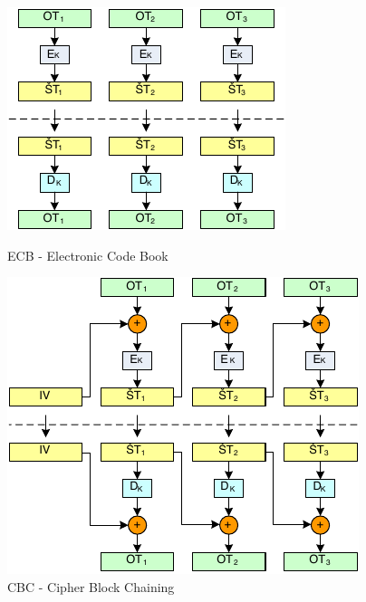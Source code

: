 \documentclass{szzclass}
\begin{document}
\begin{figure}[ht!]
\centering
\begin{minipage}{.5\textwidth}
  \centering
  \includegraphics[width=.75\linewidth]{topics/bi-spol-07/images/ecb}
  \caption{ECB - Electronic Code Book}
\end{minipage}%
\begin{minipage}{.5\textwidth}
  \centering
  \includegraphics[width=.75\linewidth]{topics/bi-spol-07/images/cbc}
  \caption{CBC - Cipher Block Chaining}
\end{minipage}
\end{figure}
\end{document}
